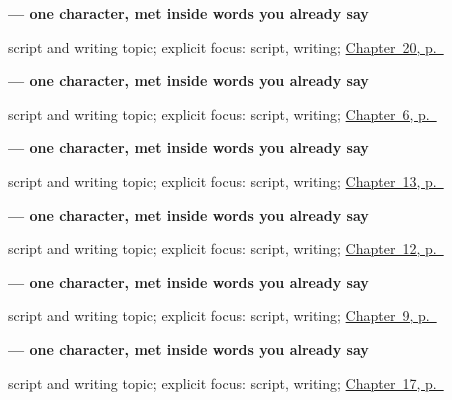 \noindent\begin{minipage}[t]{\linewidth}
\raggedright
\textbf{ — one character, met inside words you already say}\par
\footnotesize script and writing topic; explicit focus: script, writing; \hyperref[ch:ka-numbers-and-weather]{Chapter~20, p.~\pageref*{ch:ka-numbers-and-weather}}
\end{minipage}\par\smallskip

\noindent\begin{minipage}[t]{\linewidth}
\raggedright
\textbf{ — one character, met inside words you already say}\par
\footnotesize script and writing topic; explicit focus: script, writing; \hyperref[ch:ka-dative-case]{Chapter~6, p.~\pageref*{ch:ka-dative-case}}
\end{minipage}\par\smallskip

\noindent\begin{minipage}[t]{\linewidth}
\raggedright
\textbf{ — one character, met inside words you already say}\par
\footnotesize script and writing topic; explicit focus: script, writing; \hyperref[ch:ka-head-and-hand]{Chapter~13, p.~\pageref*{ch:ka-head-and-hand}}
\end{minipage}\par\smallskip

\noindent\begin{minipage}[t]{\linewidth}
\raggedright
\textbf{ — one character, met inside words you already say}\par
\footnotesize script and writing topic; explicit focus: script, writing; \hyperref[ch:ka-family]{Chapter~12, p.~\pageref*{ch:ka-family}}
\end{minipage}\par\smallskip

\noindent\begin{minipage}[t]{\linewidth}
\raggedright
\textbf{ — one character, met inside words you already say}\par
\footnotesize script and writing topic; explicit focus: script, writing; \hyperref[ch:ka-sorry]{Chapter~9, p.~\pageref*{ch:ka-sorry}}
\end{minipage}\par\smallskip

\noindent\begin{minipage}[t]{\linewidth}
\raggedright
\textbf{ — one character, met inside words you already say}\par
\footnotesize script and writing topic; explicit focus: script, writing; \hyperref[ch:ka-noon-and-midnight]{Chapter~17, p.~\pageref*{ch:ka-noon-and-midnight}}
\end{minipage}\par\smallskip

